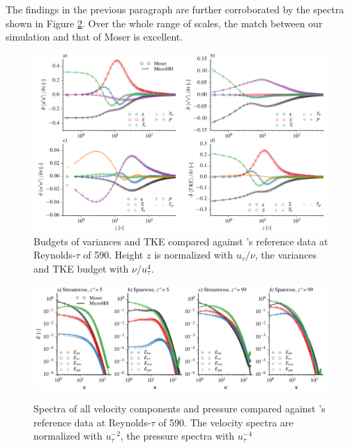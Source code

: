 \documentclass[gmd]{copernicus}
\begin{document}
The findings in the previous paragraph are further corroborated by the spectra shown in Figure \ref{fig:moser_spectra}.  Over the whole range of scales, the match between our simulation and that of Moser is excellent.


\begin{figure}[t]
\vspace*{2mm}
\begin{center}
\includegraphics[width=16.6cm]{figs/gmd_m590_turb_budg.pdf}
\end{center}
\caption{Budgets of variances and TKE compared against \citet{Moser1999}'s reference data at Reynolds-$\tau$ of 590. Height $z$ is normalized with $u_\tau / \nu$, the variances and TKE budget with $\nu / u_\tau^{4}$.}\label{fig:moser_budget}
\end{figure}

\begin{figure}[t]
\vspace*{2mm}
\begin{center}
\includegraphics[width=16.6cm]{figs/gmd_m590_spectra_4x1.pdf}\label{fig:moser_spectra}
\end{center}
\caption{Spectra of all velocity components and pressure compared against \citet{Moser1999}'s reference data at Reynolds-$\tau$ of 590. The velocity spectra are normalized with $u_\tau^{-2}$, the pressure spectra with $u_\tau^{-4}$}
\end{figure}
\end{document}
